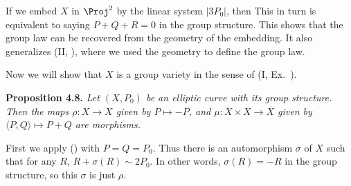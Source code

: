 {If we embed $X$ in $\Proj^2$ by the linear system $|3P_0|$, then  This in turn is equivalent to saying $P+Q+R=0$ in the group structure. This shows that the group law can be recovered from the geometry of the embedding. It also generalizes (II, ), where we used the geometry to define the group law.

Now we will show that $X$ is a group variety in the sense of (I, Ex.~).

\medskip
\noindent\hypertarget{result-IV-4.8}{}\textbf{Proposition 4.8.} \emph{Let $(X,P_0)$ be an elliptic curve with its group structure. Then the maps $\rho\colon X\to X$ given by $P\mapsto-P$, and $\mu\colon X\times X\to X$ given by $\langle P,Q\rangle\mapsto P+Q$ are morphisms.}

\Proof First we apply () with $P=Q=P_0$. Thus there is an automorphism $\sigma$ of $X$ such that for any $R$, $R+\sigma(R)\sim2P_0$. In other words, $\sigma(R)=-R$ in the group structure, so this $\sigma$ is just $\rho$.
}
